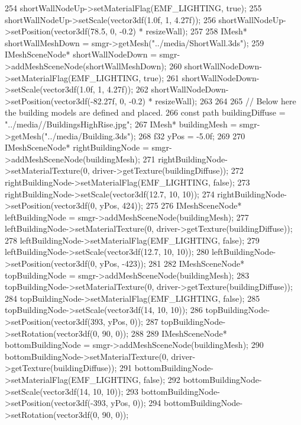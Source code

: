 \begin{DoxyCode}
254     shortWallNodeUp->setMaterialFlag(EMF\_LIGHTING, \textcolor{keyword}{true});
255     shortWallNodeUp->setScale(vector3df(1.0f, 1, 4.27f));
256     shortWallNodeUp->setPosition(vector3df(78.5, 0, -0.2) * resizeWall);
257 
258     IMesh* shortWallMeshDown = smgr->getMesh(\textcolor{stringliteral}{"../media/ShortWall.3ds"});
259     IMeshSceneNode* shortWallNodeDown = smgr->addMeshSceneNode(shortWallMeshDown);
260     shortWallNodeDown->setMaterialFlag(EMF\_LIGHTING, \textcolor{keyword}{true});
261     shortWallNodeDown->setScale(vector3df(1.0f, 1, 4.27f));
262     shortWallNodeDown->setPosition(vector3df(-82.27f, 0, -0.2) * resizeWall);
263 
264 
265     \textcolor{comment}{// Below here the building models are defined and placed.}
266     \textcolor{keyword}{const} path buildingDiffuse = \textcolor{stringliteral}{"../media//BuildingsHighRise.jpg"};
267     IMesh* buildingMesh = smgr->getMesh(\textcolor{stringliteral}{"../media/Building.3ds"});
268     f32 yPos = -5.0f;
269 
270     IMeshSceneNode* rightBuildingNode = smgr->addMeshSceneNode(buildingMesh);
271     rightBuildingNode->setMaterialTexture(0, driver->getTexture(buildingDiffuse));
272     rightBuildingNode->setMaterialFlag(EMF\_LIGHTING, \textcolor{keyword}{false});
273     rightBuildingNode->setScale(vector3df(12.7, 10, 10));
274     rightBuildingNode->setPosition(vector3df(0, yPos, 424));
275 
276     IMeshSceneNode* leftBuildingNode = smgr->addMeshSceneNode(buildingMesh);
277     leftBuildingNode->setMaterialTexture(0, driver->getTexture(buildingDiffuse));
278     leftBuildingNode->setMaterialFlag(EMF\_LIGHTING, \textcolor{keyword}{false});
279     leftBuildingNode->setScale(vector3df(12.7, 10, 10));
280     leftBuildingNode->setPosition(vector3df(0, yPos, -423));
281 
282     IMeshSceneNode* topBuildingNode = smgr->addMeshSceneNode(buildingMesh);
283     topBuildingNode->setMaterialTexture(0, driver->getTexture(buildingDiffuse));
284     topBuildingNode->setMaterialFlag(EMF\_LIGHTING, \textcolor{keyword}{false});
285     topBuildingNode->setScale(vector3df(14, 10, 10));
286     topBuildingNode->setPosition(vector3df(393, yPos, 0));
287     topBuildingNode->setRotation(vector3df(0, 90, 0));
288 
289     IMeshSceneNode* bottomBuildingNode = smgr->addMeshSceneNode(buildingMesh);
290     bottomBuildingNode->setMaterialTexture(0, driver->getTexture(buildingDiffuse));
291     bottomBuildingNode->setMaterialFlag(EMF\_LIGHTING, \textcolor{keyword}{false});
292     bottomBuildingNode->setScale(vector3df(14, 10, 10));
293     bottomBuildingNode->setPosition(vector3df(-393, yPos, 0));
294     bottomBuildingNode->setRotation(vector3df(0, 90, 0));

\end{DoxyCode}
